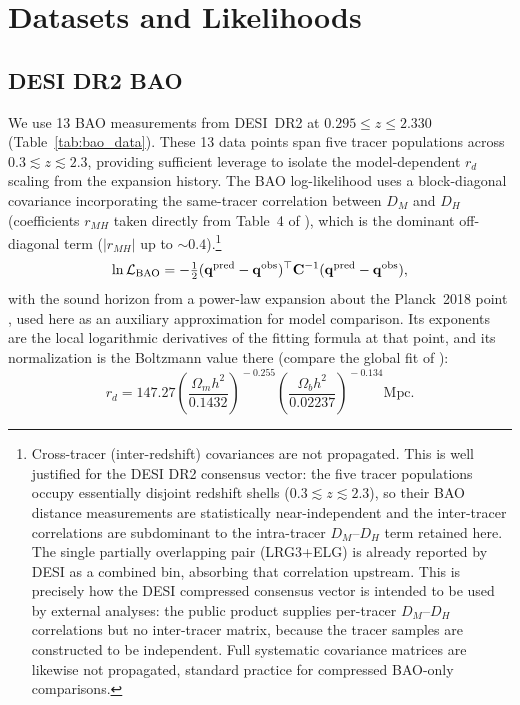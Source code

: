 \documentclass[12pt,a4paper]{article}
\begin{document}
\section{Datasets and Likelihoods}
\label{sec:data}

\subsection{DESI DR2 BAO}

We use 13 BAO measurements from DESI~DR2 \citep{DESI_DR2} at
$0.295\leq z\leq2.330$ (Table~\ref{tab:bao_data}). These 13 data points
span five tracer populations across $0.3\lesssim z\lesssim 2.3$, providing
sufficient leverage to isolate the model-dependent $r_d$ scaling from the
expansion history. The BAO log-likelihood uses a block-diagonal covariance incorporating the same-tracer correlation between $D_M$ and $D_H$ (coefficients $r_{MH}$ taken directly from Table~4 of \citealt{DESI_DR2}), which is the dominant off-diagonal term ($|r_{MH}|$ up to $\sim0.4$).\footnote{Cross-tracer (inter-redshift) covariances are not propagated. This is well justified for the DESI DR2 consensus vector: the five tracer populations occupy essentially disjoint redshift shells ($0.3\lesssim z\lesssim 2.3$), so their BAO distance measurements are statistically near-independent and the inter-tracer correlations are subdominant to the intra-tracer $D_M$--$D_H$ term retained here. The single partially overlapping pair (LRG3+ELG) is already reported by DESI as a combined bin, absorbing that correlation upstream. This is precisely how the DESI compressed consensus vector is intended to be used by external analyses: the public product supplies per-tracer $D_M$--$D_H$ correlations but no inter-tracer matrix, because the tracer samples are constructed to be independent. Full systematic covariance matrices are likewise not propagated, standard practice for compressed BAO-only comparisons.}
\begin{equation}
  \ln\mathcal{L}_{\rm BAO}
  = -\tfrac{1}{2} (\mathbf{q}^{\rm pred}-\mathbf{q}^{\rm obs})^\top \mathbf{C}^{-1} (\mathbf{q}^{\rm pred}-\mathbf{q}^{\rm obs}),
\end{equation}
with the sound horizon from a power-law expansion about the Planck~2018
point \citep{Planck2018}, used here as an auxiliary approximation for model
comparison. Its exponents are the local logarithmic derivatives of the
\citet{EisensteinHu1998} fitting formula at that point, and its normalization
is the Boltzmann value there (compare the global fit of
\citealt{Aubourg2015}):
\begin{equation}
  r_d = 147.27\!\left(\frac{\Omega_m h^2}{0.1432}\right)^{\!-0.255}\!
  \left(\frac{\Omega_b h^2}{0.02237}\right)^{\!-0.134}\!\text{Mpc}.
  \label{eq:rd}
\end{equation}
\end{document}
